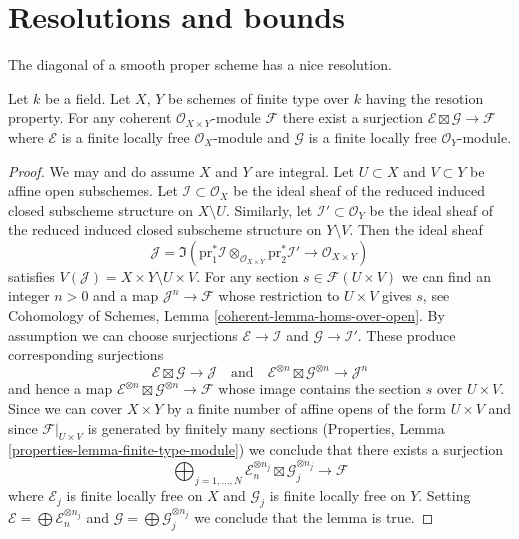 \section{Resolutions and bounds}
\label{section-tricks-smooth}

\noindent
The diagonal of a smooth proper scheme has a nice resolution.

\begin{lemma}
\label{lemma-on-product}
Let $k$ be a field. Let $X$, $Y$ be schemes of finite type over $k$
having the resotion property. For any coherent
$\mathcal{O}_{X \times Y}$-module $\mathcal{F}$ there exist
a surjection $\mathcal{E} \boxtimes \mathcal{G} \to \mathcal{F}$
where $\mathcal{E}$ is a finite locally free $\mathcal{O}_X$-module
and $\mathcal{G}$ is a finite locally free $\mathcal{O}_Y$-module.
\end{lemma}

\begin{proof}
We may and do assume $X$ and $Y$ are integral. Let $U \subset X$ and
$V \subset Y$ be affine open subschemes. Let
$\mathcal{I} \subset \mathcal{O}_X$ be the ideal sheaf of the
reduced induced closed subscheme structure on $X \setminus U$.
Similarly, let $\mathcal{I}' \subset \mathcal{O}_Y$ be the ideal sheaf of the
reduced induced closed subscheme structure on $Y \setminus V$.
Then the ideal sheaf
$$
\mathcal{J} = \Im(\text{pr}_1^*\mathcal{I} \otimes_{\mathcal{O}_{X \times Y}}
\text{pr}_2^*\mathcal{I}' \to \mathcal{O}_{X \times Y})
$$
satisfies $V(\mathcal{J}) = X \times Y \setminus U \times V$.
For any section $s \in \mathcal{F}(U \times V)$ we can find an integer
$n > 0$ and a map $\mathcal{J}^n \to \mathcal{F}$ whose restriction to
$U \times V$ gives $s$, see
Cohomology of Schemes, Lemma \ref{coherent-lemma-homs-over-open}.
By assumption we can choose surjections
$\mathcal{E} \to \mathcal{I}$ and $\mathcal{G} \to \mathcal{I}'$.
These produce corresponding surjections
$$
\mathcal{E} \boxtimes \mathcal{G} \to \mathcal{J}
\quad\text{and}\quad
\mathcal{E}^{\otimes n} \boxtimes \mathcal{G}^{\otimes n} \to \mathcal{J}^n
$$
and hence a map
$\mathcal{E}^{\otimes n} \boxtimes \mathcal{G}^{\otimes n} \to \mathcal{F}$
whose image contains the section $s$ over $U \times V$.
Since we can cover $X \times Y$ by a finite number of affine opens
of the form $U \times V$ and since $\mathcal{F}|_{U \times V}$
is generated by finitely many sections (Properties, Lemma
\ref{properties-lemma-finite-type-module})
we conclude that there exists a surjection
$$
\bigoplus\nolimits_{j = 1, \ldots, N}
\mathcal{E}_n^{\otimes n_j} \boxtimes \mathcal{G}_j^{\otimes n_j}
\to \mathcal{F}
$$
where $\mathcal{E}_j$ is finite locally free on $X$ and
$\mathcal{G}_j$ is finite locally free on $Y$.
Setting $\mathcal{E} = \bigoplus \mathcal{E}_n^{\otimes n_j}$
and $\mathcal{G} = \bigoplus \mathcal{G}_j^{\otimes n_j}$
we conclude that the lemma is true.
\end{proof}

